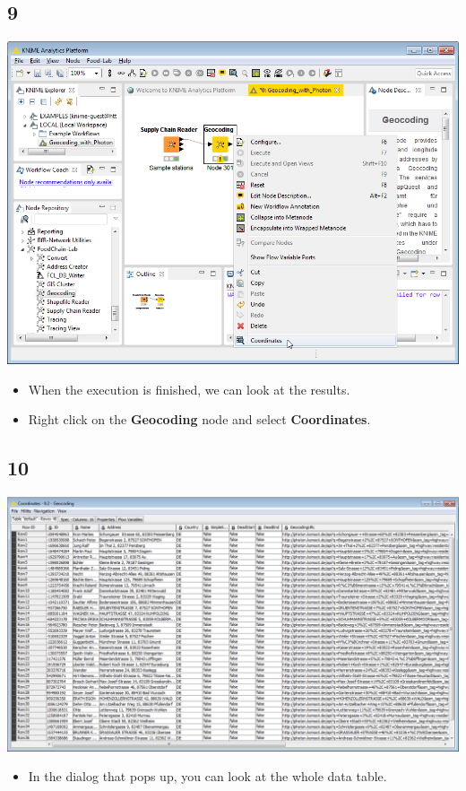 \documentclass{beamer}
\begin{document}
\subsection{9}
\begin{frame}
	\begin{center}
  		\includegraphics[height=0.6\textheight]{9.png}
	\end{center}
	\begin{itemize}
		\item When the execution is finished, we can look at the results.
		\item Right click on the \textbf{Geocoding} node and select \textbf{Coordinates}.
	\end{itemize}
\end{frame}

\subsection{10}
\begin{frame}
	\begin{center}
  		\includegraphics[height=0.6\textheight]{10.png}
	\end{center}
	\begin{itemize}
		\item In the dialog that pops up, you can look at the whole data table.
	\end{itemize}
\end{frame}
\end{document}
